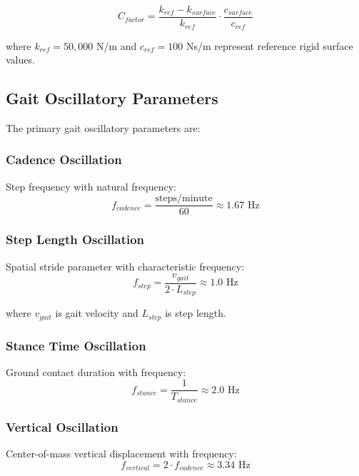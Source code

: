 \documentclass[12pt]{article}
\begin{document}
\begin{equation}
C_{factor} = \frac{k_{ref} - k_{surface}}{k_{ref}} \cdot \frac{c_{surface}}{c_{ref}}
\end{equation}

where $k_{ref} = 50,000$ N/m and $c_{ref} = 100$ Ns/m represent reference rigid surface values.

\subsection{Gait Oscillatory Parameters}

The primary gait oscillatory parameters are:

\subsubsection{Cadence Oscillation}
Step frequency with natural frequency:
\begin{equation}
f_{cadence} = \frac{\text{steps/minute}}{60} \approx 1.67 \text{ Hz}
\end{equation}

\subsubsection{Step Length Oscillation}
Spatial stride parameter with characteristic frequency:
\begin{equation}
f_{step} = \frac{v_{gait}}{2 \cdot L_{step}} \approx 1.0 \text{ Hz}
\end{equation}

where $v_{gait}$ is gait velocity and $L_{step}$ is step length.

\subsubsection{Stance Time Oscillation}
Ground contact duration with frequency:
\begin{equation}
f_{stance} = \frac{1}{T_{stance}} \approx 2.0 \text{ Hz}
\end{equation}

\subsubsection{Vertical Oscillation}
Center-of-mass vertical displacement with frequency:
\begin{equation}
f_{vertical} = 2 \cdot f_{cadence} \approx 3.34 \text{ Hz}
\end{equation}
\end{document}

